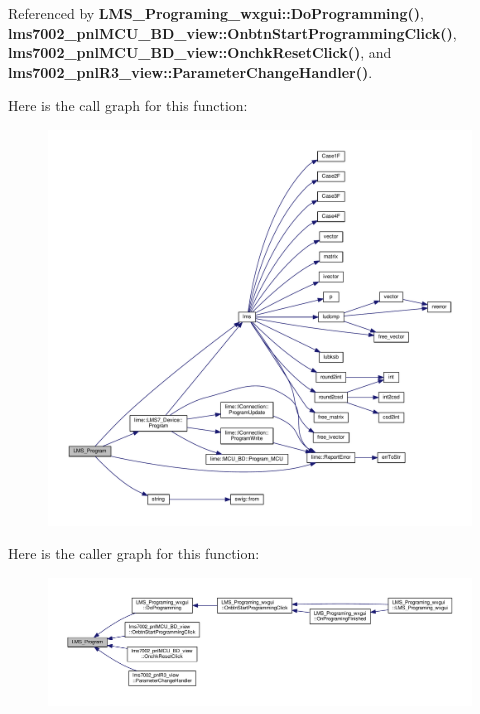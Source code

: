Referenced by {\bf L\+M\+S\+\_\+\+Programing\+\_\+wxgui\+::\+Do\+Programming()}, {\bf lms7002\+\_\+pnl\+M\+C\+U\+\_\+\+B\+D\+\_\+view\+::\+Onbtn\+Start\+Programming\+Click()}, {\bf lms7002\+\_\+pnl\+M\+C\+U\+\_\+\+B\+D\+\_\+view\+::\+Onchk\+Reset\+Click()}, and {\bf lms7002\+\_\+pnl\+R3\+\_\+view\+::\+Parameter\+Change\+Handler()}.



Here is the call graph for this function\+:
\nopagebreak
\begin{figure}[H]
\begin{center}
\leavevmode
\includegraphics[width=350pt]{df/de1/lms7__api_8cpp_a1f9be91569904f87e02b61153f8f24c3_cgraph}
\end{center}
\end{figure}




Here is the caller graph for this function\+:
\nopagebreak
\begin{figure}[H]
\begin{center}
\leavevmode
\includegraphics[width=350pt]{df/de1/lms7__api_8cpp_a1f9be91569904f87e02b61153f8f24c3_icgraph}
\end{center}
\end{figure}


